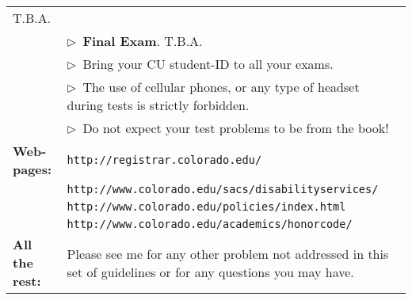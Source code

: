 \documentclass[10pt]{article}
\begin{document}
\begin{tabular}{lp{5.2in}}
        T.B.A.
            \\
      & $\triangleright$~\textbf{Final Exam}.\/ 
        T.B.A.      \\
       & $\triangleright$~Bring your CU student-ID to all your exams.
      \\
      & $\triangleright$~The use of cellular phones, or any type of headset 
        during tests is strictly forbidden.
      \\
      & $\triangleright$~Do not expect your test problems to be from the book!
      \\[8pt]
%
%
\textbf{Web-pages:} 
      &  \texttt{http://registrar.colorado.edu/}
      \\ 
      &  \texttt{http://www.colorado.edu/sacs/disabilityservices/}
      \\ 
      &  \texttt{http://www.colorado.edu/policies/index.html}
      \\ 
      &  \texttt{http://www.colorado.edu/academics/honorcode/}
      \\[8pt]
\textbf{All the rest:} 
      & Please see me for any other problem not addressed in this set of 
        guidelines or for any questions you may have.
      \\[8pt]
%
\end{tabular}
\end{document}
